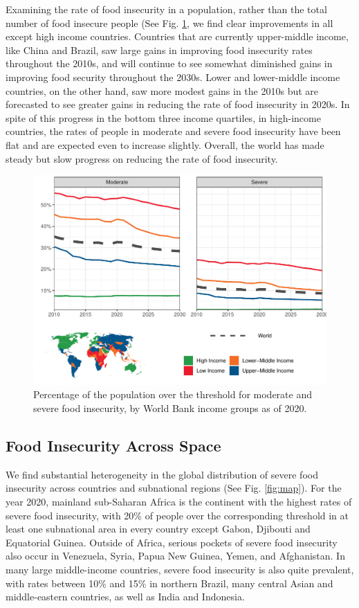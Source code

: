\documentclass{article}
\begin{document}
Examining the rate of food insecurity in a population, rather than the total number of food insecure people (See Fig. \ref{fig:rates}, we find clear improvements in all except high income countries.  Countries that are currently upper-middle income, like China and Brazil, saw large gains in improving food insecurity rates throughout the 2010s, and will continue to see somewhat diminished gains in improving food security throughout the 2030s.  Lower and lower-middle income countries, on the other hand, saw more modest gains in the 2010s but are forecasted to see greater gains in reducing the rate of food insecurity in 2020s.  In spite of this progress in the bottom three income quartiles, in high-income countries, the rates of people in moderate and severe food insecurity have been flat and are expected even to increase slightly.  Overall, the world has made steady but slow progress on reducing the rate of food insecurity.

\begin{figure}[H]
  \centering
  \includegraphics[width=\linewidth]{img/Rates.pdf}
  \caption{Percentage of the population over the threshold for moderate and severe food insecurity, by World Bank income groups as of 2020.}
  \label{fig:rates}
\end{figure}


\subsection{Food Insecurity Across Space}
We find substantial heterogeneity in the global distribution of severe food insecurity across countries and subnational regions (See Fig. \ref{fig:map}).  For the year 2020, mainland sub-Saharan Africa is the continent with the highest rates of severe food insecurity, with 20\% of people over the corresponding threshold in at least one subnational area in every country except Gabon, Djibouti and Equatorial Guinea.  Outside of Africa, serious pockets of severe food insecurity also occur in Venezuela, Syria, Papua New Guinea, Yemen, and Afghanistan.  In many large middle-income countries, severe food insecurity is also quite prevalent, with rates between 10\% and 15\% in northern Brazil, many central Asian and middle-eastern countries, as well as India and Indonesia.
\end{document}
